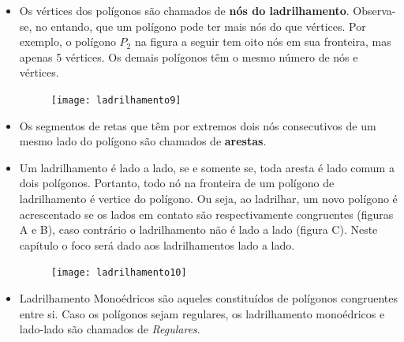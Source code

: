 \begin{itemize}
	\item Os vértices dos polígonos são chamados de \textbf{nós do ladrilhamento}. Observa-se, no entando, que um polígono pode ter mais nós do que vértices. Por exemplo, o polígono $P_2$ na figura a seguir tem oito nós em sua fronteira, mas apenas 5 vértices. Os demais polígonos têm o mesmo número de nós e vértices.

	\begin{figure}[H]
	\centering
	\texttt{[image: ladrilhamento9]}
	\end{figure}

	\item Os segmentos de retas que têm por extremos dois nós consecutivos de um mesmo lado do polígono são chamados de \textbf{arestas}.
	\item Um ladrilhamento é lado a lado, se e somente se, toda aresta é lado comum a dois polígonos. Portanto, todo nó na fronteira de um polígono de ladrilhamento é vertice do polígono. Ou seja, ao ladrilhar, um novo polígono é acrescentado se os lados em contato são respectivamente congruentes (figuras A e B), caso contrário o ladrilhamento não é lado a lado (figura C). Neste capítulo o foco será dado aos ladrilhamentos lado a lado.

	\begin{figure}[H]
	\centering
	\texttt{[image: ladrilhamento10]}
	\end{figure}

	\item Ladrilhamento Monoédricos são aqueles constituídos de polígonos congruentes entre si. Caso os polígonos sejam regulares, os ladrilhamento monoédricos e lado-lado são chamados de \textit{Regulares}.
\end{itemize}

\exercise

